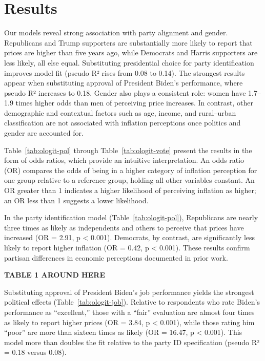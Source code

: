 \documentclass[preprint,12pt,authoryear]{elsarticle}
\begin{document}
\section{Results}
Our models reveal strong association with party alignment and gender. Republicans and Trump supporters are substantially more likely to report that prices are higher than five years ago, while Democrats and Harris supporters are less likely, all else equal. Substituting presidential choice for party identification improves model fit (pseudo R² rises from 0.08 to 0.14). The strongest results appear when substituting approval of President Biden’s performance, where pseudo R² increases to 0.18. Gender also plays a consistent role: women have 1.7–1.9 times higher odds than men of perceiving price increases. In contrast, other demographic and contextual factors such as age, income, and rural–urban classification are not associated with inflation perceptions once politics and gender are accounted for.

Table~\ref{tab:ologit-pol} through Table~\ref{tab:ologit-vote} present the results in the form of odds ratios, which provide an intuitive interpretation. An odds ratio (OR) compares the odds of being in a higher category of inflation perception for one group relative to a reference group, holding all other variables constant. An OR greater than 1 indicates a higher likelihood of perceiving inflation as higher; an OR less than 1 suggests a lower likelihood.

In the party identification model (Table~\ref{tab:ologit-pol}), Republicans are nearly three times as likely as independents and others to perceive that prices have increased (OR = 2.91, p < 0.001). Democrats, by contrast, are significantly less likely to report higher inflation (OR = 0.42, p < 0.001). These results confirm partisan differences in economic perceptions documented in prior work.

\begin{center}
\textbf{TABLE 1 AROUND HERE}
\end{center}

Substituting approval of President Biden’s job performance yields the strongest political effects (Table~\ref{tab:ologit-job}). Relative to respondents who rate Biden’s performance as “excellent,” those with a “fair” evaluation are almost four times as likely to report higher prices (OR = 3.84, p < 0.001), while those rating him “poor” are more than sixteen times as likely (OR = 16.47, p < 0.001). This model more than doubles the fit relative to the party ID specification (pseudo R² = 0.18 versus 0.08).
\end{document}
